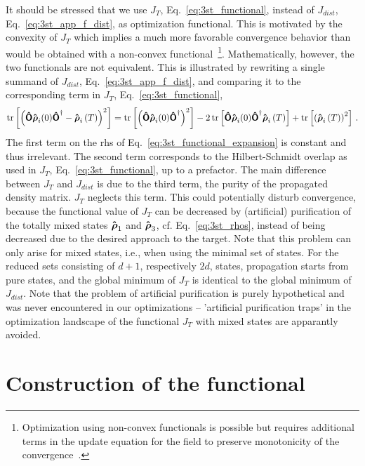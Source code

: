 It should be stressed that we use $J_T$, Eq.~\eqref{eq:3st_functional}, 
instead of $J_{dist}$, Eq.~\eqref{eq:3st_app_f_dist},
as optimization functional. This is motivated by the convexity of
$J_T$ which implies a much more favorable convergence behavior than
would be obtained with a non-convex functional~\footnote{Optimization
  using non-convex functionals is possible but requires additional
  terms in the update equation for the field to preserve monotonicity
  of the convergence~\cite{ReichKochJCP12}.
}. Mathematically, however, the two functionals are not equivalent. 
This is illustrated by rewriting a single summand of $J_{dist}$,
Eq.~\eqref{eq:3st_app_f_dist}, and comparing it to 
the corresponding term in $J_T$, Eq.~\eqref{eq:3st_functional},
\begin{equation}
  \operatorname{tr}\left[\left(\boldsymbol{\mathsf{\hat{O}}}\boldsymbol{\mathsf{\hat{\rho}}}_{i}(0)\boldsymbol{\mathsf{\hat{O}}}^{\dagger}-\boldsymbol{\mathsf{\hat{\rho}}}_{i}\left(T\right)\right)^2\right] 
  = \operatorname{tr}\left[\left(\boldsymbol{\mathsf{\hat{O}}}\boldsymbol{\mathsf{\hat{\rho}}}_{i}(0)\boldsymbol{\mathsf{\hat{O}}}^{\dagger}\right)^2\right]-2\operatorname{tr}\left[\boldsymbol{\mathsf{\hat{O}}}\boldsymbol{\mathsf{\hat{\rho}}}_{i}(0)\boldsymbol{\mathsf{\hat{O}}}^{\dagger}\boldsymbol{\mathsf{\hat{\rho}}}_{i}\left(T\right)\right] 
   + \operatorname{tr}\left[\left(\boldsymbol{\mathsf{\hat{\rho}}}_{i}\left(T\right)\right)^2\right]\,.
  \label{eq:3st_functional_expansion}
\end{equation}
The first term on the rhs of Eq.~\eqref{eq:3st_functional_expansion} is
constant and thus irrelevant. The second term corresponds 
to the Hilbert-Schmidt overlap as used in $J_T$,
Eq.~\eqref{eq:3st_functional}, up to a prefactor. The main difference between 
$J_T$ and $J_{dist}$ is due to the third term, 
the purity of the propagated density matrix. 
$J_T$ neglects this term. This could potentially disturb convergence,
because  the functional value of $J_T$ can be decreased 
by (artificial) purification of the totally mixed states $\boldsymbol{\mathsf{\hat{\rho}}}_1$ and
$\boldsymbol{\mathsf{\hat{\rho}}}_3$, cf. Eq.~\eqref{eq:3st_rhos}, instead of being decreased due
to the desired approach to the target. 
Note that this problem can only arise for mixed states, i.e., when
using the minimal set of states. For the reduced sets consisting of $d+1$,
respectively $2d$, states, propagation starts from pure states, and the global
minimum of $J_T$ is identical to the global minimum of $J_{dist}$.
Note that the problem of artificial purification is purely
hypothetical and was never encountered 
in our optimizations --  'artificial purification traps' in
the optimization landscape of the functional  
$J_T$ with mixed states are apparantly avoided.

\section{Construction of the functional}
\label{sec:3_states_proof_funct}

